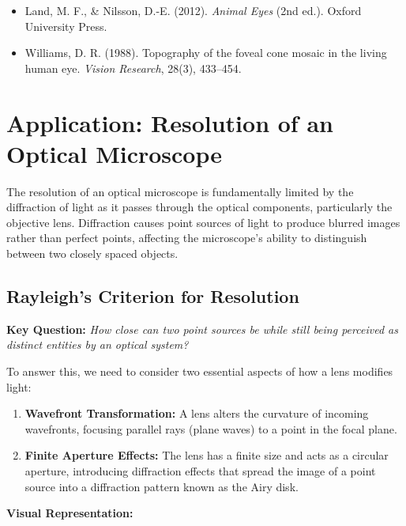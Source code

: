 \documentclass[
  a4paper,
]{book}
\providecommand{\tightlist}{%
  \setlength{\itemsep}{0pt}\setlength{\parskip}{0pt}}
\begin{document}
\begin{tcolorbox}
\begin{itemize}
\tightlist
\item
  Land, M. F., \& Nilsson, D.-E. (2012). \emph{Animal Eyes} (2nd ed.).
  Oxford University Press.
\item
  Williams, D. R. (1988). Topography of the foveal cone mosaic in the
  living human eye. \emph{Vision Research}, 28(3), 433--454.
\end{itemize}

\end{tcolorbox}

\section{Application: Resolution of an Optical
Microscope}\label{application-resolution-of-an-optical-microscope}

The resolution of an optical microscope is fundamentally limited by the
diffraction of light as it passes through the optical components,
particularly the objective lens. Diffraction causes point sources of
light to produce blurred images rather than perfect points, affecting
the microscope's ability to distinguish between two closely spaced
objects.

\subsection{Rayleigh's Criterion for
Resolution}\label{rayleighs-criterion-for-resolution}

\textbf{Key Question:} \emph{How close can two point sources be while
still being perceived as distinct entities by an optical system?}

To answer this, we need to consider two essential aspects of how a lens
modifies light:

\begin{enumerate}
\def\labelenumi{\arabic{enumi}.}
\item
  \textbf{Wavefront Transformation:} A lens alters the curvature of
  incoming wavefronts, focusing parallel rays (plane waves) to a point
  in the focal plane.
\item
  \textbf{Finite Aperture Effects:} The lens has a finite size and acts
  as a circular aperture, introducing diffraction effects that spread
  the image of a point source into a diffraction pattern known as the
  Airy disk.
\end{enumerate}

\textbf{Visual Representation:}
\end{document}
